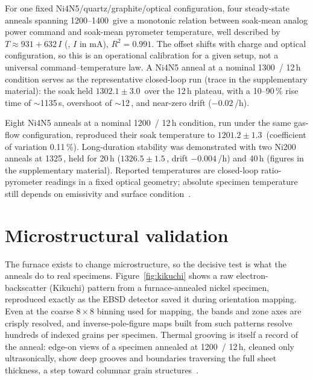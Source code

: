 \documentclass[%
 aip,
 rsi,%
 amsmath,amssymb,
 reprint,%
]{revtex4-2}
\begin{document}
For one fixed Ni4N5/quartz/graphite/optical configuration, four
steady-state anneals spanning 1200--1400\,\celsius{} give a monotonic relation
between soak-mean analog power command and soak-mean pyrometer temperature,
well described by $T \approx 931 + 632\,I$ (\celsius, $I$ in mA),
$R^2 = 0.991$. The offset shifts with charge and
optical configuration, so this is an operational calibration for a given
setup, not a universal command--temperature law. A Ni4N5 anneal at a nominal
1300\,\celsius{} / 12\,h condition serves as the representative closed-loop
run (trace in the supplementary material): the soak held
$1302.1 \pm 3.0$\,\celsius{} over the 12\,h plateau, with a 10--90\,\% rise
time of $\sim$1135\,s, overshoot of $\sim$12\,\celsius, and near-zero drift
($-0.02$\,\celsius/h).

Eight Ni4N5 anneals at a nominal 1200\,\celsius{} / 12\,h condition, run
under the same gas-flow configuration, reproduced their soak temperature to
$1201.2 \pm 1.3$\,\celsius{} (coefficient of variation
0.11\,\%). Long-duration stability was
demonstrated with two Ni200 anneals at 1325\,\celsius, held for 20\,h
($1326.5 \pm 1.5$\,\celsius, drift $-0.004$\,\celsius/h) and 40\,h (figures in
the supplementary material). Reported temperatures are closed-loop
ratio-pyrometer readings in a fixed optical geometry; absolute specimen
temperature still depends on emissivity and surface
condition~\cite{ham2016insituspectralemissivity,giulietti2025spectralemissivitymeasurement,kieruj2016determinationofemissivity}.

\section{Microstructural validation}

The furnace exists to change microstructure, so the decisive test is what the
anneals do to real specimens. Figure~\ref{fig:kikuchi} shows a raw
electron-backscatter (Kikuchi) pattern from a furnace-annealed nickel
specimen, reproduced exactly as the EBSD detector saved it during orientation
mapping. Even at the coarse $8\times8$ binning used for mapping, the bands
and zone axes are crisply resolved, and inverse-pole-figure maps built from
such patterns resolve hundreds of indexed grains per
specimen. Thermal grooving is itself a record of the anneal: edge-on views
of a specimen annealed at 1200\,\celsius{} / 12\,h, cleaned only
ultrasonically, show deep grooves and boundaries traversing the full sheet
thickness, a step toward columnar grain
structures~\cite{zhang2007dynamicsandmechanism}.
\end{document}
